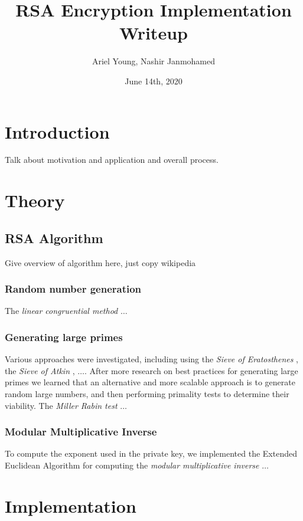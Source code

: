 \documentclass{article}
\title{RSA Encryption Implementation Writeup}
\author{Ariel Young, Nashir Janmohamed}
\date{June 14th, 2020}
\begin{document}
\maketitle

\tableofcontents

\section{Introduction}
Talk about motivation and application and overall process.
\section{Theory}

\subsection{RSA Algorithm}
Give overview of algorithm here, just copy wikipedia

\subsubsection{Random number generation}
The \textit{linear congruential method} \cite{linearcongruential} $\dots$

\subsubsection{Generating large primes}
Various approaches were investigated, including using the \textit{Sieve of Eratosthenes} \cite{sieveeratosthenes}, the \textit{Sieve of Atkin} \cite{sieveatkin}, $\dots$. After more research on best practices for generating large primes we learned that an alternative and more scalable approach is to generate random large numbers, and then performing primality tests to determine their viability. The \textit{Miller Rabin test} \cite{millerrabin} $\dots$

\subsubsection{Modular Multiplicative Inverse}
To compute the exponent used in the private key, we implemented the Extended Euclidean Algorithm for computing the \textit{modular multiplicative inverse} \cite{mmi} $\dots$


\section{Implementation}
\end{document}
